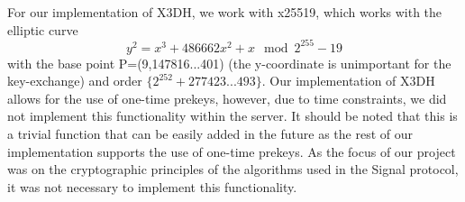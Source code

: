 For our implementation of X3DH, we work with x25519, which works with the elliptic curve 
$$
 y^2 = x^3 + 486662x^2 + x \mod 2^{255}-19
$$
with the base point P=(9,147816...401) (the y-coordinate is unimportant for the key-exchange) and order \( \{2^{252} + 277423...493 \} \).
Our implementation of X3DH allows for the use of one-time prekeys, however, due to time constraints, we did not implement this functionality within the server. It should be noted that this is a trivial function that can be easily added in the future as the rest of our implementation supports the use of one-time prekeys. As the focus of our project was on the cryptographic principles of the algorithms used in the Signal protocol, it was not necessary to implement this functionality.